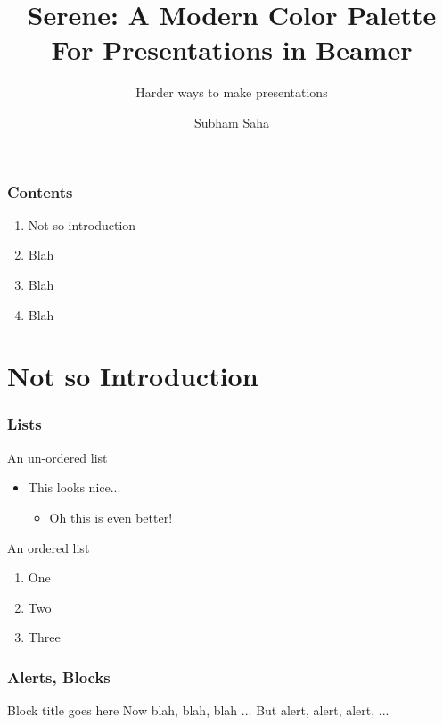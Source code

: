 \documentclass{beamer}
\title{Serene: A Modern Color Palette For Presentations in Beamer}
\subtitle{Harder ways to make presentations}
\author{Subham Saha}
\begin{document}
\noProgressBar
\maketitle

\begin{frame}
	\frametitle{Contents}
	\begin{enumerate}
		\item Not so introduction
		\item Blah
		\item Blah
		\item Blah
	\end{enumerate}
\end{frame}

\startProgressBar
\section{Not so Introduction}
	\begin{frame}
		\frametitle{Lists}
		An un-ordered list
		\begin{itemize}
			\item This looks nice...
			\begin{itemize}
				\item Oh this is even better!
			\end{itemize}
		\end{itemize}
		An ordered list
		\begin{enumerate}
			\item One
			\item Two
			\item Three
		\end{enumerate}
	\end{frame}
	
	\begin{frame}
		\frametitle{Alerts, Blocks}
		\begin{block}{Block title goes here}
			Now blah, blah, blah ...
			But \alert{alert}, \alert{alert}, \alert{alert}, ...
		\end{block}
		
		
	\end{frame}
\end{document}
